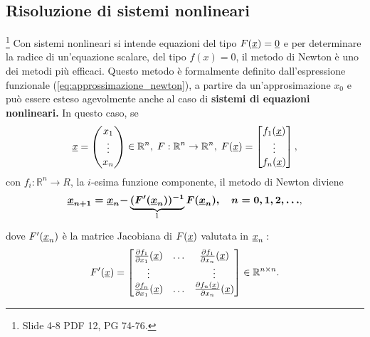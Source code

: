 \subsection{Risoluzione di sistemi nonlineari}\label{ssec:risoluzione_sistemi_nonlineari}\footnote{Slide 4-8 PDF 12, PG 74-76.}
Con sistemi nonlineari si intende equazioni del tipo $F(\uline x) = \uline 0$ e per determinare la radice di un'equazione scalare, del tipo $f(x)=0$, il metodo di Newton è uno dei metodi più efficaci. Questo metodo è formalmente definito dall'espressione funzionale (\ref{eq:approssimazione_newton}), a partire da un'approsimazione $x_0$ e può essere esteso agevolmente anche al caso di \textbf{sistemi di equazioni nonlineari.} In questo caso, se 
\begin{equation}
    \uline x =
    \begin{pmatrix}
        x_1\\
        \vdots\\
        x_n
    \end{pmatrix}\in\mathbb R^n,\; F:\mathbb R^n\rightarrow\mathbb R^n,\; F(\uline x)=
    \begin{bmatrix}
        f_1(\uline x)\\
        \vdots\\
        f_n(\uline x)
    \end{bmatrix},
\end{equation}
con $f_i:\mathbb R^n\rightarrow R$, la $i$-esima funzione componente, il metodo di Newton diviene 
\begin{equation}\label{eq:newtSistNonLinEq}
    \boldsymbol{\uline x_{n+1} = \uline x_n -} \underbrace{\boldsymbol{(F'(\uline x_n))^{-1}}}_{\footnotemark}\boldsymbol{F(\uline x_n),\quad n=0,1,2,\hdots},
\end{equation}
dove $F'(\uline x_n)$ è la matrice Jacobiana di $F(\uline x)$ valutata in $\uline x_n:$
\begin{equation*}
    F'(\uline x)=
    \begin{bmatrix}
        \frac{\partial f_1}{\partial x_1}(\uline x) & \hdots & \frac{\partial f_1}{\partial x_n}(\uline x)\\
        \vdots & &\vdots\\
        \frac{\partial f_n}{\partial x_1}(\uline x) & \hdots & \frac{\partial f_n(\uline x)}{\partial x_n}(\uline x)
    \end{bmatrix}\in\mathbb R^{n\times n}.
\end{equation*}


